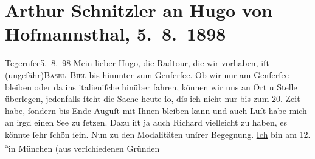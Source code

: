 

         
         \renewcommand{\erwaehntePersonen}{Personen: Richard Beer-Hofmann, Hugo von Hofmannsthal, Gustav Schwarzkopf}
         \renewcommand{\erwaehnteOrte}{Orte: Basel, Biel, Genfer See, Hinterbrühl, Innsbruck, Italien, München, Salzburg, Tegernsee, Wien}
         \renewcommand{\erwaehnteWerke}{Werke: Der Tod Georgs}
               \section[Arthur Schnitzler an Hugo von Hofmannsthal, 5. 8. 1898]{ Arthur Schnitzler an Hugo von Hofmannsthal, 5. 8. 1898}\nopagebreak{}\rehead{ }\begin{ledgroupsized}[t]{13cm}\normalsize\beginnumbering \toendnotes[C]{\smallbreak\pagebreak[2]} 
\toendnotes[C]{\smallbreak}\pstart
           \raggedleft{}{\pb}Tegernſee5. 8. 98\pend
           \pstart
           Mein lieber Hugo, die Radtour, die wir vorhaben, iſt \introOben{}(\introOben{}ungefähr\introOben{})\introOben{}{ }\textsc{Basel}–\textsc{Biel} bis hinunter zum Genferſee. Ob wir nur am
                  Genferſee bleiben oder da{\geminationn} ins italieniſche
               hinüber fahren, können wir uns an Ort u Stelle überlegen, jedenfalls ſteht die Sache
               heute ſo, dſs ich nicht nur bis zum 20. Zeit habe, ſondern bis
                  Ende Auguſt mit Ihnen bleiben kann und auch Luſt habe {\pb}mich an irgd einen See zu ſetzen. Dazu iſt ja auch Richard vielleicht zu haben, es könnte ſehr
               ſchön ſein.\pend
           \pstart
           Nun zu den Modalitäten unſrer Begegnung. \uline{Ich} bin am
                  12.{ }\substVorne{}\textsuperscript{a}\substDazwischen{}i\substHinten{}n München (aus verſchiedenen Gründen

\end{ledgroupsized}
